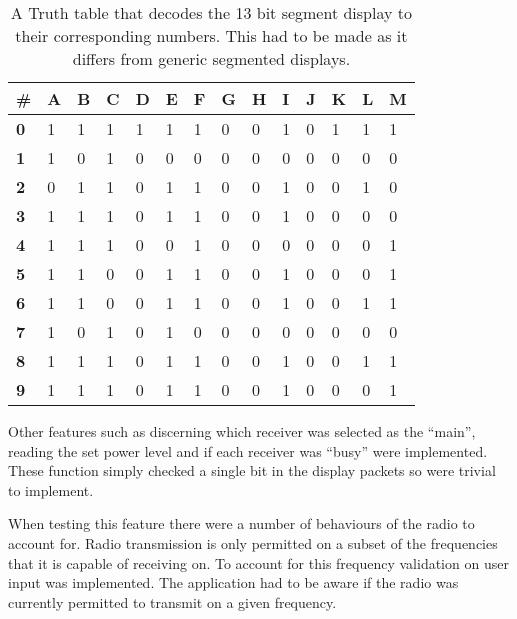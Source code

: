 \begin{table}[h!]
\vspace{0.5cm}
\centering
\begin{tabular}{l|l|l|l|l|l|l|l|l|l|l|l|l|l}
\# & \textbf{A} & \textbf{B} & \textbf{C} & \textbf{D} & \textbf{E} & \textbf{F} & \textbf{G} & \textbf{H} & \textbf{I} & \textbf{J} & \textbf{K} & \textbf{L} & \textbf{M} \\
\hline
\textbf{0} & 1 & 1 & 1 & 1 & 1 & 1 & 0 & 0 & 1 & 0 & 1 & 1 & 1 \\
\hline
\textbf{1} & 1 & 0 & 1 & 0 & 0 & 0 & 0 & 0 & 0 & 0 & 0 & 0 & 0 \\
\hline
\textbf{2} & 0 & 1 & 1 & 0 & 1 & 1 & 0 & 0 & 1 & 0 & 0 & 1 & 0 \\
\hline
\textbf{3} & 1 & 1 & 1 & 0 & 1 & 1 & 0 & 0 & 1 & 0 & 0 & 0 & 0 \\
\hline
\textbf{4} & 1 & 1 & 1 & 0 & 0 & 1 & 0 & 0 & 0 & 0 & 0 & 0 & 1 \\
\hline
\textbf{5} & 1 & 1 & 0 & 0 & 1 & 1 & 0 & 0 & 1 & 0 & 0 & 0 & 1 \\
\hline
\textbf{6} & 1 & 1 & 0 & 0 & 1 & 1 & 0 & 0 & 1 & 0 & 0 & 1 & 1 \\
\hline
\textbf{7} & 1 & 0 & 1 & 0 & 1 & 0 & 0 & 0 & 0 & 0 & 0 & 0 & 0 \\
\hline
\textbf{8} & 1 & 1 & 1 & 0 & 1 & 1 & 0 & 0 & 1 & 0 & 0 & 1 & 1 \\
\hline
\textbf{9} & 1 & 1 & 1 & 0 & 1 & 1 & 0 & 0 & 1 & 0 & 0 & 0 & 1
\end{tabular}
\label{13_segment_truth}
\caption[13 Segment Truth table]{A Truth table that decodes the 13 bit segment display to their corresponding numbers. This had to be made as it differs from generic segmented displays.}
\vspace{0.5cm}
\end{table}

Other features such as discerning which receiver was selected as the ``main'', reading the set power level and if each receiver was ``busy'' were implemented. These function simply checked a single bit in the display packets so were trivial to implement.

When testing this feature there were a number of behaviours of the radio to account for. Radio transmission is only permitted on a subset of the frequencies that it is capable of receiving on. To account for this frequency validation on user input was implemented. The application had to be aware if the radio was currently permitted to transmit on a given frequency. 


